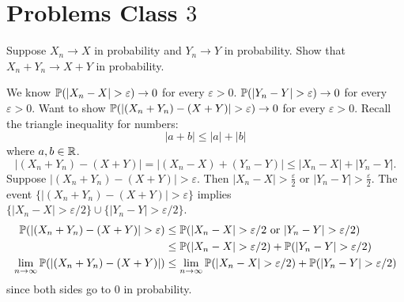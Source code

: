 \documentclass[10pt, a4paper]{article}
\begin{document}
\newpage

\section{Problems Class \texorpdfstring{$3$}{}}

\begin{problem}
    Suppose $X_n \to X$ in probability and $Y_n \to Y$ in probability.
    Show that $X_n + Y_n \to X + Y$ in probability.

    \begin{solution}
        We know $\P(|X_n - X| > \varepsilon) \to 0$ for every $\varepsilon > 0$.
        $\P(|Y_n - Y| > \varepsilon) \to 0$ for every $\varepsilon > 0$.
        Want to show $\P(|(X_n + Y_n) - (X + Y)| > \varepsilon) \to 0$ for every $\varepsilon > 0$.
        Recall the triangle inequality for numbers:
        \[
        |a + b| \leq |a| + |b|
        \]
        where $a, b \in \R$.
        \[
        |(X_n + Y_n) - (X + Y)| = |(X_n - X) + (Y_n - Y)| \leq |X_n - X| + |Y_n - Y|.
        \]
        Suppose $|(X_n + Y_n) - (X + Y)| > \varepsilon$.
        Then $|X_n - X| > \frac{\varepsilon}{2}$ or $|Y_n - Y| > \frac{\varepsilon}{2}$.
        The event $\{|(X_n + Y_n) - (X + Y)| > \varepsilon\}$ implies $\{|X_n - X| > \varepsilon / 2\} \cup \{|Y_n - Y| > \varepsilon / 2\}$.
        \begin{align*}
            \P(|(X_n + Y_n) - (X + Y)| > \varepsilon) &\leq \P(|X_n - X| > \varepsilon / 2\text{ or } |Y_n - Y| > \varepsilon / 2) \\
            &\leq \P(|X_n - X| > \varepsilon / 2) + \P(|Y_n - Y| > \varepsilon / 2) \\
            \lim_{n \to \infty}\P(|(X_n + Y_n) - (X + Y)|) &\leq \lim_{n \to \infty}\P(|X_n - X| > \varepsilon / 2) + \P(|Y_n - Y| > \varepsilon / 2)
        \end{align*}
        since both sides go to $0$ in probability.
    \end{solution}
\end{problem}
\end{document}

